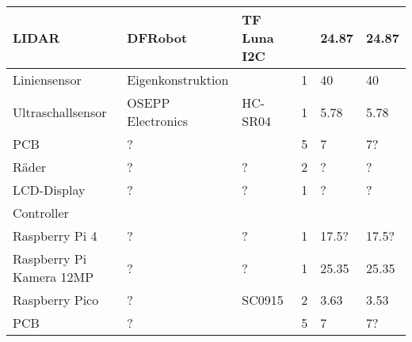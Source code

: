 \documentclass[main.tex]{subfiles} %
\begin{document}
\begin{table}[h]
\begin{tabular}{|p{3cm}|p{3cm}|p{3cm}|p{1cm}|p{1.5cm}|p{1cm}|}
        LIDAR                                  & DFRobot                & TF Luna I2C                     &                     & 24.87                      & 24.87                           \\ \hline
        Liniensensor                           & Eigenkonstruktion      &                                 & 1                   & 40                         & 40                              \\ \hline
        Ultraschallsensor                      & OSEPP Electronics      & HC-SR04                         & 1                   & 5.78                       & 5.78                            \\ \hline
        PCB                                    & ?                      &                                 & 5                   & 7                          & 7?                              \\ \hline
        Räder                                  & ?                      & ?                               & 2                   & ?                          & ?                              \\ \hline
        LCD-Display                            & ?                      & ?                               & 1                   & ?                          & ?                              \\ \hline
        \rowcolor{lightgray} Controller        &                        &                                 &                     &                            &                                 \\ \hline
        Raspberry Pi 4                         & ?                      & ?                               & 1                   & 17.5?                      & 17.5?                           \\ \hline
        Raspberry Pi Kamera 12MP               & ?                      & ?                               & 1                   & 25.35                      & 25.35                           \\ \hline
        Raspberry Pico                         & ?                      & SC0915                          & 2                   & 3.63                       & 3.53                            \\ \hline
        PCB                                    & ?                      &                                 & 5                   & 7                          & 7?                              \\ \hline

\end{tabular}
\end{table}
\end{document}
